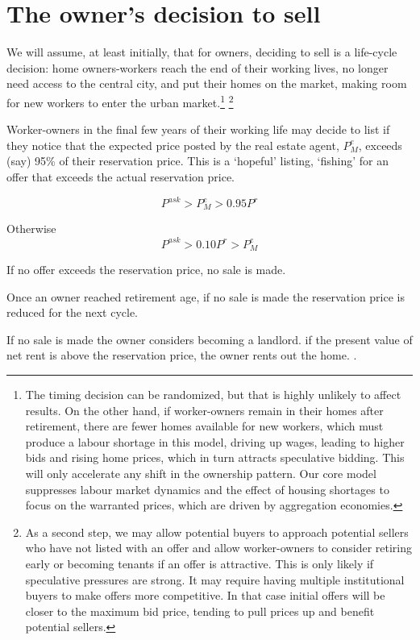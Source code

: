 \section{The owner's decision to sell}
We will assume, at least initially, that for owners, deciding to sell is a life-cycle decision: home owners-workers  reach the end of their working lives, no longer need access to the central city, and put their homes on the market, making room for new workers to enter the urban market.\footnote{The timing decision can be randomized, but that is highly unlikely to affect results. On the other hand, 
\color{red}
if worker-owners remain in their homes after retirement, there are fewer homes available for new workers, which must produce a labour shortage in this model, driving up wages, leading to higher bids and rising home prices, which in turn attracts  speculative bidding. This will only accelerate any shift in the ownership pattern. Our core model suppresses labour market dynamics and the effect of housing shortages to focus on the warranted prices, which are driven by aggregation economies. 
\color{black}} 
\footnote{\color{blue}As a second step, we may allow potential buyers  to approach potential sellers who have not listed with an offer and allow worker-owners to consider retiring early or becoming tenants if an offer is attractive.  This is only likely if speculative pressures are strong. It may require having multiple institutional buyers to make offers more competitive. In that case initial offers will be closer to the maximum bid price, tending to pull prices up and benefit potential sellers.\color{black}}  

Worker-owners in the final few years of their working life may decide to  list if  they notice that the expected price posted by the real estate agent, $P_M^e$,  exceeds (say) 95\% of their reservation price. This is a `hopeful' listing, `fishing' for an offer that exceeds the actual reservation price.

\[P^{ask}>P_M^e> 0.95 P^r\] 

Otherwise
\[P^{ask}> 0.10P^r>P_M^e\] 

If no offer exceeds the reservation price, no sale is made.

Once an owner reached retirement age, if no sale is made the reservation price is reduced for the next cycle.

If no sale is made the owner considers becoming a landlord. if the present value of net rent is above the reservation price, the owner rents out the home. .



